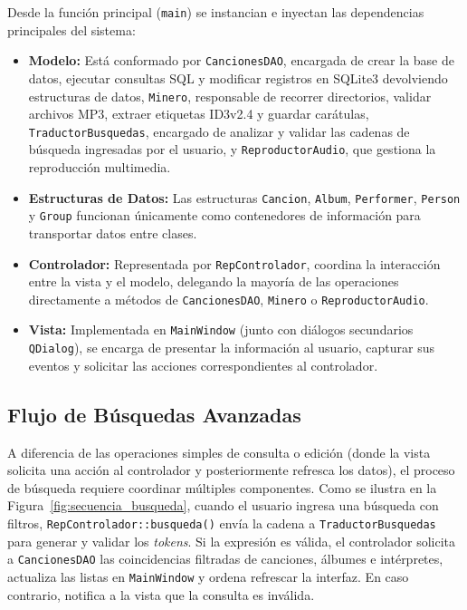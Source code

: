 \documentclass[11pt,a4paper]{article}
\begin{document}
Desde la función principal (\texttt{main}) se instancian e inyectan las dependencias principales del sistema:

\begin{itemize}
    \item \textbf{Modelo:} Está conformado por \texttt{CancionesDAO}, encargada de crear la base de datos, ejecutar consultas SQL y modificar registros en SQLite3 devolviendo estructuras de datos, \texttt{Minero}, responsable de recorrer directorios, validar archivos MP3, extraer etiquetas ID3v2.4 y guardar carátulas, \texttt{TraductorBusquedas}, encargado de analizar y validar las cadenas de búsqueda ingresadas por el usuario, y \texttt{ReproductorAudio}, que gestiona la reproducción multimedia.
    
    \item \textbf{Estructuras de Datos:} Las estructuras \texttt{Cancion}, \texttt{Album}, \texttt{Performer}, \texttt{Person} y \texttt{Group} funcionan únicamente como contenedores de información para transportar datos entre clases.

    \item \textbf{Controlador:} Representada por \texttt{RepControlador}, coordina la interacción entre la vista y el modelo, delegando la mayoría de las operaciones directamente a métodos de \texttt{CancionesDAO}, \texttt{Minero} o \texttt{ReproductorAudio}.
    
    \item \textbf{Vista:} Implementada en \texttt{MainWindow} (junto con diálogos secundarios \texttt{QDialog}), se encarga de presentar la información al usuario, capturar sus eventos y solicitar las acciones correspondientes al controlador.
    \end{itemize}

    \subsection{Flujo de Búsquedas Avanzadas} 
    A diferencia de las operaciones simples de consulta o edición (donde la vista solicita una acción al controlador y posteriormente refresca los datos), el proceso de búsqueda requiere coordinar múltiples componentes. Como se ilustra en la Figura~\ref{fig:secuencia_busqueda}, cuando el usuario ingresa una búsqueda con filtros, \texttt{RepControlador::busqueda()} envía la cadena a \texttt{TraductorBusquedas} para generar y validar los \textit{tokens}. Si la expresión es válida, el controlador solicita a \texttt{CancionesDAO} las coincidencias filtradas de canciones, álbumes e intérpretes, actualiza las listas en \texttt{MainWindow} y ordena refrescar la interfaz. En caso contrario, notifica a la vista que la consulta es inválida. 
    
\end{document}
